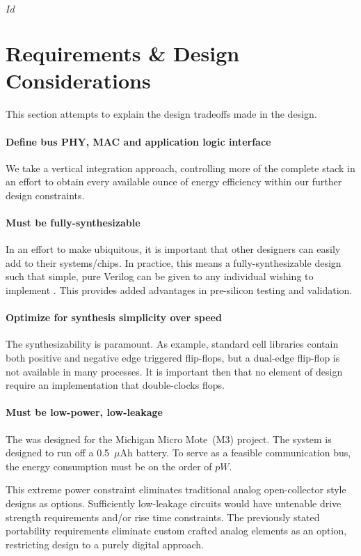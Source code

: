 \svnInfo $Id$

\section{Requirements \& Design Considerations}
\label{sec:requirements}
\label{sec:design}
This section attempts to explain the design tradeoffs made in the \bus design.

\paragraph{Define bus PHY, MAC and application logic interface}
We take a vertical integration approach, controlling more of the complete
stack in an effort to obtain every available ounce of energy efficiency within
our further design constraints.

\paragraph{Must be fully-synthesizable}
In an effort to make \bus ubiquitous, it is important that other designers can
easily add \bus to their systems/chips. In practice, this means a
fully-synthesizable design such that simple, pure Verilog can be given to any
individual wishing to implement \bus. This provides added advantages in
pre-silicon testing and validation.

\paragraph{Optimize for synthesis simplicity over speed}
The synthesizability is paramount. As example, standard cell libraries contain
both positive and negative edge triggered flip-flops, but a dual-edge
flip-flop is not available in many processes. It is important then that no
element of \bus design require an implementation that double-clocks flops.

\paragraph{Must be low-power, low-leakage}
The \bus was designed for the Michigan Micro Mote~(M3) project. The system is
designed to run off a 0.5~$\mu$Ah battery. To serve as a feasible
communication bus, the energy consumption must be on the order of $pW$.

This extreme power constraint eliminates traditional analog open-collector
style designs as options. Sufficiently low-leakage circuits would have
untenable drive strength requirements and/or rise time constraints. The
previously stated portability requirements eliminate custom crafted analog
elements as an option, restricting \bus design to a purely digital approach.

